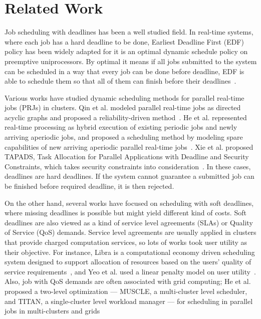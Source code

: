 \chapter{Related Work}\label{chap:related}

Job scheduling with deadlines has been a well studied field.
In real-time systems, where each job has a hard deadline to be done,
Earliest Deadline First (EDF) policy has been widely adapted for it is
an optimal dynamic schedule policy on preemptive
uniprocessors.
By optimal it means if all jobs submitted to the system can be scheduled
in a way that every job can be done before deadline, EDF is able to
schedule them so that all of them can finish before their
deadlines~\cite{cite:pinedo2012scheduling}.

Various works have studied dynamic scheduling methods for parallel
real-time jobs (PRJs) in clusters.
Qin et al. modeled parallel real-time jobs as directed acyclic graphs
and proposed a reliability-driven
method~\cite{cite:qin-reliability-driven}.
He et al. represented real-time processing as hybrid execution of
existing periodic jobs and newly arriving aperiodic jobs, and proposed a
scheduling method by modeling spare capabilities of new arriving
aperiodic parallel real-time jobs~\cite{cite:he-spare-capabilities}.
Xie et al. proposed TAPADS, Task Allocation for Parallel Applications
with Deadline and Security Constraints, which takes security constraints
into consideration~\cite{cite:xie-TAPADS,cite:xie2008security}.
In these cases, deadlines are hard deadlines.
If the system cannot guarantee a submitted job can be finished before
required deadline, it is then rejected.

On the other hand, several works have focused on scheduling with soft
deadlines, where missing deadlines is possible but might yield different
kind of costs.
Soft deadlines are also viewed as a kind of service level agreements
(SLAs) or Quality of Service (QoS) demands.
Service level agreements are usually applied in clusters that provide
charged computation services, so lots of works took user utility as
their objective.
For instance, Libra is a computational economy driven scheduling system
designed to support allocation of resources based on the users' quality
of service requirements~\cite{cite:libra}, and Yeo et al. used a linear
penalty model on user utility~\cite{cite:yeo-SLA-penalty}.
Also, job with QoS demands are often associated with grid computing; He
et al. proposed a two-level optimization --- MUSCLE, a multi-cluster
level scheduler, and TITAN, a single-cluster level workload manager ---
for scheduling in parallel jobs in multi-clusters and
grids~\cite{cite:he-muscle-titan}

